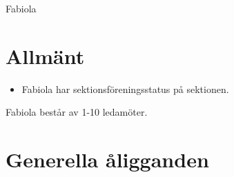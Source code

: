 \documentclass[a4paper]{article}
\begin{document}
\renewcommand{\forening}{Fabiola} %
\begin{foreningenv}{\forening{}} %
    \section{Allmänt}
    \begin{itemize}
        \item Fabiola har sektionsföreningsstatus på sektionen.
    \end{itemize}
    Fabiola består av 1-10 ledamöter.
    
    \section{Generella åligganden}
    \aliggsektfor{} %

\end{foreningenv}
\end{document}
